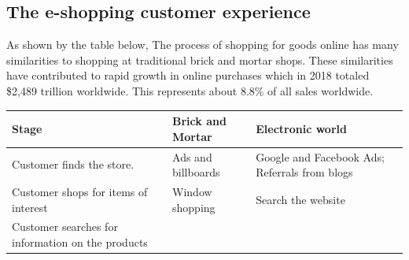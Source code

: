 \documentclass[]{book}
\begin{document}
\hypertarget{the-e-shopping-customer-experience}{%
\subsection{The e-shopping customer experience}\label{the-e-shopping-customer-experience}}

As shown by the table below, The process of shopping for goods online has many similarities to shopping at traditional brick and mortar shops. These similarities have contributed to rapid growth in online purchases which in 2018 totaled \$2,489 trillion worldwide. This represents about 8.8\% of all sales worldwide. \citep{Saleh2019}

\begin{longtable}[]{@{}lll@{}}
\toprule
\begin{minipage}[b]{0.15\columnwidth}\raggedright
Stage\strut
\end{minipage} & \begin{minipage}[b]{0.38\columnwidth}\raggedright
Brick and Mortar\strut
\end{minipage} & \begin{minipage}[b]{0.38\columnwidth}\raggedright
Electronic world\strut
\end{minipage}\tabularnewline
\midrule
\endhead
\begin{minipage}[t]{0.15\columnwidth}\raggedright
Customer finds the store.\strut
\end{minipage} & \begin{minipage}[t]{0.38\columnwidth}\raggedright
Ads and billboards\strut
\end{minipage} & \begin{minipage}[t]{0.38\columnwidth}\raggedright
Google and Facebook Ads; Referrals from blogs\strut
\end{minipage}\tabularnewline
\begin{minipage}[t]{0.15\columnwidth}\raggedright
Customer shops for items of interest\strut
\end{minipage} & \begin{minipage}[t]{0.38\columnwidth}\raggedright
Window shopping\strut
\end{minipage} & \begin{minipage}[t]{0.38\columnwidth}\raggedright
Search the website\strut
\end{minipage}\tabularnewline
\begin{minipage}[t]{0.15\columnwidth}\raggedright
Customer searches for information on the products\strut
\end{minipage} & \begin{minipage}[t]{0.38\columnwidth}\raggedright

\end{minipage}
\end{longtable}
\end{document}
